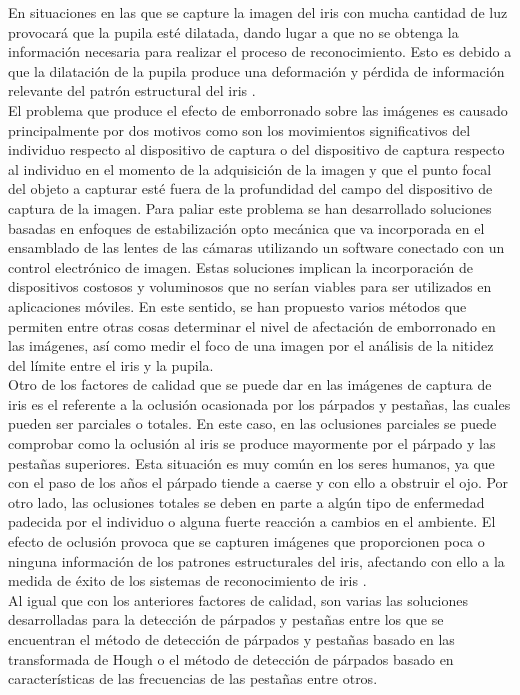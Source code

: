 En situaciones en las que se capture la imagen del iris con mucha cantidad de luz provocará que la pupila esté dilatada, dando lugar a que no se obtenga la información necesaria para realizar el proceso de reconocimiento. Esto es debido a que la dilatación de la pupila produce una deformación y pérdida de información relevante del patrón estructural del iris \cite{Reference9}.\\

El problema que produce el efecto de emborronado sobre las imágenes es causado principalmente por dos motivos como son los movimientos significativos del individuo respecto al dispositivo de captura o del dispositivo de captura respecto al individuo en el momento de la adquisición de la imagen y que el punto focal del objeto a capturar esté fuera de la profundidad del campo del dispositivo de captura de la imagen. Para paliar este problema se han desarrollado soluciones basadas en enfoques de estabilización opto mecánica que va incorporada en el ensamblado de las lentes de las cámaras utilizando un software conectado con un control electrónico de imagen. Estas soluciones implican la incorporación de dispositivos costosos y voluminosos que no serían viables para ser utilizados en aplicaciones móviles. En este sentido, se han propuesto varios métodos que permiten entre otras cosas  determinar el nivel de afectación de emborronado  en las imágenes, así como medir el foco de una imagen por el análisis de la nitidez del límite entre el iris y la pupila. \\

Otro de los factores de calidad que se puede dar en las imágenes de captura de iris es el referente a la oclusión ocasionada por los párpados y pestañas, las cuales pueden ser parciales o totales. En este caso, en las oclusiones parciales se puede comprobar como la oclusión al iris se produce mayormente por el párpado y las pestañas superiores. Esta situación es muy común en los seres humanos, ya que con el paso de los años el párpado tiende a caerse y con ello a obstruir el ojo. Por otro lado, las oclusiones totales se deben en parte a algún tipo de enfermedad padecida por el individuo o alguna fuerte reacción a cambios en el ambiente. El efecto de oclusión provoca que se capturen imágenes que proporcionen poca o ninguna información de los patrones estructurales del iris, afectando con ello a la medida de éxito de los sistemas de reconocimiento de iris \cite{Reference9}.\\

Al igual que con los anteriores factores de calidad, son varias las soluciones desarrolladas para la detección de párpados y pestañas entre los que se encuentran el método de detección de párpados y pestañas basado en las transformada de Hough \cite{Reference10} o el método de detección de párpados basado en características de las frecuencias de las pestañas \cite{Reference11} entre otros. \\

